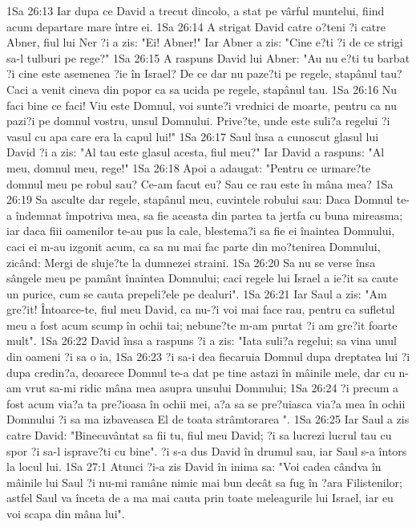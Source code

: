 1Sa 26:13  Iar dupa ce David a trecut dincolo, a stat pe vârful muntelui, fiind acum departare mare între ei.
1Sa 26:14  A strigat David catre o?teni ?i catre Abner, fiul lui Ner ?i a zis: "Ei! Abner!" Iar Abner a zis: "Cine e?ti ?i de ce strigi sa-l tulburi pe rege?"
1Sa 26:15  A raspuns David lui Abner: "Au nu e?ti tu barbat ?i cine este asemenea ?ie în Israel? De ce dar nu paze?ti pe regele, stapânul tau? Caci a venit cineva din popor ca sa ucida pe regele, stapânul tau.
1Sa 26:16  Nu faci bine ce faci! Viu este Domnul, voi sunte?i vrednici de moarte, pentru ca nu pazi?i pe domnul vostru, unsul Domnului. Prive?te, unde este suli?a regelui ?i vasul cu apa care era la capul lui!"
1Sa 26:17  Saul însa a cunoscut glasul lui David ?i a zis: "Al tau este glasul acesta, fiul meu?" Iar David a raspuns: "Al meu, domnul meu, rege!"
1Sa 26:18  Apoi a adaugat: "Pentru ce urmare?te domnul meu pe robul sau? Ce-am facut eu? Sau ce rau este în mâna mea?
1Sa 26:19  Sa asculte dar regele, stapânul meu, cuvintele robului sau: Daca Domnul te-a îndemnat împotriva mea, sa fie aceasta din partea ta jertfa cu buna mireasma; iar daca fiii oamenilor te-au pus la cale, blestema?i sa fie ei înaintea Domnului, caci ei m-au izgonit acum, ca sa nu mai fac parte din mo?tenirea Domnului, zicând: Mergi de sluje?te la dumnezei straini.
1Sa 26:20  Sa nu se verse însa sângele meu pe pamânt înaintea Domnului; caci regele lui Israel a ie?it sa caute un purice, cum se cauta prepeli?ele pe dealuri".
1Sa 26:21  Iar Saul a zis: "Am gre?it! Întoarce-te, fiul meu David, ca nu-?i voi mai face rau, pentru ca sufletul meu a fost acum scump în ochii tai; nebune?te m-am purtat ?i am gre?it foarte mult".
1Sa 26:22  David însa a raspuns ?i a zis: "Iata suli?a regelui; sa vina unul din oameni ?i sa o ia,
1Sa 26:23  ?i sa-i dea fiecaruia Domnul dupa dreptatea lui ?i dupa credin?a, deoarece Domnul te-a dat pe tine astazi în mâinile mele, dar cu n-am vrut sa-mi ridic mâna mea asupra unsului Domnului;
1Sa 26:24  ?i precum a fost acum via?a ta pre?ioasa în ochii mei, a?a sa se pre?uiasca via?a mea în ochii Domnului ?i sa ma izbaveasca El de toata strâmtorarea ".
1Sa 26:25  Iar Saul a zis catre David: "Binecuvântat sa fii tu, fiul meu David; ?i sa lucrezi lucrul tau cu spor ?i sa-l isprave?ti cu bine". ?i s-a dus David în drumul sau, iar Saul s-a întors la locul lui.
1Sa 27:1  Atunci ?i-a zis David în inima sa: "Voi cadea cândva în mâinile lui Saul ?i nu-mi ramâne nimic mai bun decât sa fug în ?ara Filistenilor; astfel Saul va înceta de a ma mai cauta prin toate meleagurile lui Israel, iar eu voi scapa din mâna lui".
